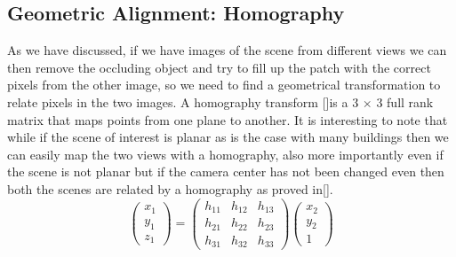 \documentclass[conference]{IEEEtran}
\begin{document}
\subsection{Geometric Alignment: Homography}
	As we have discussed, if we have images of the scene from different views we can then remove the occluding object and try to fill up the patch with the correct pixels from the other image, so we need to find a geometrical transformation to relate pixels in the two images. A homography transform []is a 3 $\times$ 3 full rank matrix that maps points from one plane to another. It is interesting to note that while if the scene of interest is planar as is the case with many buildings then we can easily map the two views with a homography, also more importantly even if the scene is not planar but if the camera center has not been changed even then both the scenes are related by a homography as proved in[\cite{hartley2003multiple}].
\[
  \begin{pmatrix} x_1 \\ y_1\\z_1 \end{pmatrix} = 
  \begin{pmatrix} h_11 & h_12 & h_13\\ h_21 & h_22 & h_23\\ h_31 & h_32 & h_33 \end{pmatrix} 
  \begin{pmatrix} x_2 \\ y_2\\1 \end{pmatrix}
\]
\end{document}
